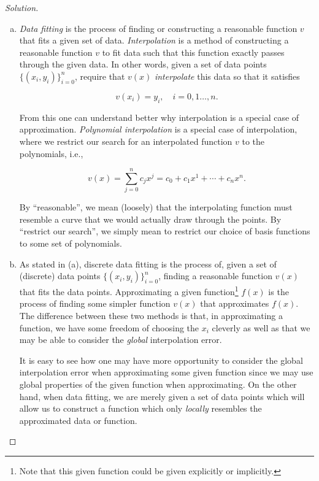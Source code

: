 \documentclass[12pt,a4]{article}
\theoremstyle{definition}
\begin{document}
\begin{proof}[Solution]
	\begin{enumerate}[(a)]
		\item \emph{Data fitting} is the process of finding or constructing a reasonable function $v$ that fits a given set of data. \emph{Interpolation} is a method of constructing a reasonable function $v$ to fit data such that this function exactly passes through the given data. In other words, given a set of data points $\{ (x_i, y_i) \}_{i = 0}^n$, require that $v(x)$ \emph{interpolate} this data so that it satisfies 
		
		\[
		v(x_i) = y_i {,} \quad i = 0, 1 \ldots, n {.}
		\]		
		
		From this one can understand better why interpolation is a special case of approximation. \emph{Polynomial interpolation} is a special case of interpolation, where we restrict our search for an interpolated function $v$ to the polynomials, i.e., 
		
		\[
		v(x) = \sum_{j = 0}^{n} c_j x^j = c_0 + c_1 x^1 + \cdots + c_n x^n {.}
		\]
		
		By ``reasonable'', we mean (loosely) that the interpolating function must resemble a curve that we would actually draw through the points. By ``restrict our search'', we simply mean to restrict our choice of basis functions to some set of polynomials. 
		
		\item As stated in (a), discrete data fitting is the process of, given a set of (discrete) data points $\{ (x_i, y_i) \}_{i = 0}^n$, finding a reasonable function $v(x)$ that fits the data points. Approximating a given function\footnote{Note that this given function could be given explicitly or implicitly.} $f(x)$ is the process of finding some simpler function $v(x)$ that approximates $f(x)$. The difference between these two methods is that, in approximating a function, we have some freedom of choosing the $x_i$ cleverly as well as that we may be able to consider the \emph{global} interpolation error. 
		
		It is easy to see how one may have more opportunity to consider the global interpolation error when approximating some given function since we may use global properties of the given function when approximating. On the other hand, when data fitting, we are merely given a set of data points which will allow us to construct a function which only \emph{locally} resembles the approximated data or function. 
		

\end{enumerate}
\end{proof}
\end{document}
